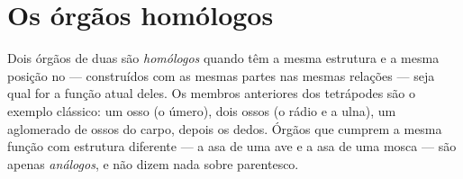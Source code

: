 \section{Os órgãos homólogos}

\begin{definition}[Homologia]\label{def:g10:common-ancestry:homology}
Dois órgãos de duas  são \emph{homólogos}
quando têm a mesma estrutura e a mesma posição no 
--- construídos com as mesmas partes nas mesmas relações --- seja qual
for a função atual deles. Os membros anteriores dos tetrápodes são o
exemplo clássico: um osso (o úmero), dois ossos (o rádio e a ulna), um
aglomerado de ossos do carpo, depois os dedos. Órgãos que cumprem a
mesma função com estrutura diferente --- a asa de uma ave e a asa de
uma mosca --- são apenas \emph{análogos}, e não dizem nada sobre
parentesco.
\end{definition}

